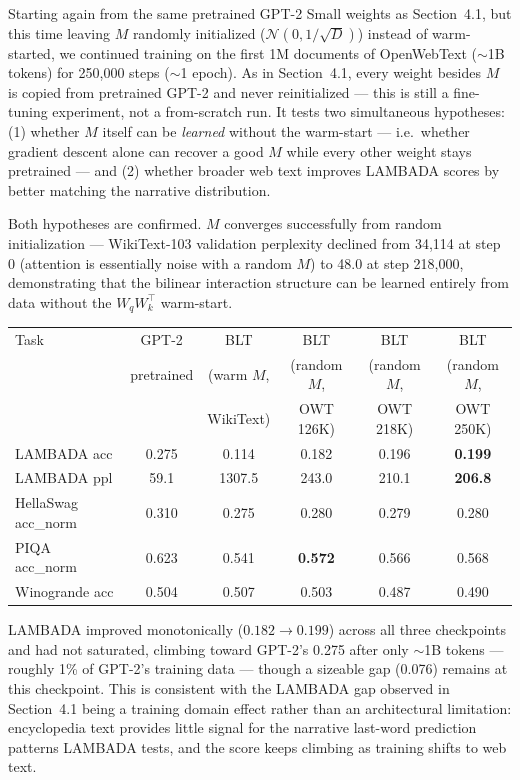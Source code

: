 \documentclass[11pt]{article}
\begin{document}
Starting again from the same pretrained GPT-2 Small weights as Section~4.1, but this time leaving $M$ randomly initialized ($\mathcal{N}(0, 1/\sqrt{D})$) instead of warm-started, we continued training on the first 1M documents of OpenWebText ($\sim$1B tokens) for 250{,}000 steps ($\sim$1 epoch). As in Section~4.1, every weight besides $M$ is copied from pretrained GPT-2 and never reinitialized --- this is still a fine-tuning experiment, not a from-scratch run. It tests two simultaneous hypotheses: (1) whether $M$ itself can be \emph{learned} without the warm-start --- i.e.\ whether gradient descent alone can recover a good $M$ while every other weight stays pretrained --- and (2) whether broader web text improves LAMBADA scores by better matching the narrative distribution.

Both hypotheses are confirmed. $M$ converges successfully from random initialization --- WikiText-103 validation perplexity declined from 34{,}114 at step 0 (attention is essentially noise with a random $M$) to 48.0 at step 218{,}000, demonstrating that the bilinear interaction structure can be learned entirely from data without the $W_q W_k^\top$ warm-start.

\begin{center}
\begin{tabular}{lccccc}
\toprule
Task & GPT-2 & BLT & BLT & BLT & BLT \\
 & pretrained & (warm $M$, & (random $M$, & (random $M$, & (random $M$, \\
 & & WikiText) & OWT 126K) & OWT 218K) & OWT 250K) \\
\midrule
LAMBADA acc & 0.275 & 0.114 & 0.182 & 0.196 & \textbf{0.199} \\
LAMBADA ppl & 59.1 & 1307.5 & 243.0 & 210.1 & \textbf{206.8} \\
HellaSwag acc\_norm & 0.310 & 0.275 & 0.280 & 0.279 & 0.280 \\
PIQA acc\_norm & 0.623 & 0.541 & \textbf{0.572} & 0.566 & 0.568 \\
Winogrande acc & 0.504 & 0.507 & 0.503 & 0.487 & 0.490 \\
\bottomrule
\end{tabular}
\end{center}

LAMBADA improved monotonically ($0.182 \rightarrow 0.199$) across all three checkpoints and had not saturated, climbing toward GPT-2's 0.275 after only $\sim$1B tokens --- roughly 1\% of GPT-2's training data --- though a sizeable gap (0.076) remains at this checkpoint. This is consistent with the LAMBADA gap observed in Section~4.1 being a training domain effect rather than an architectural limitation: encyclopedia text provides little signal for the narrative last-word prediction patterns LAMBADA tests, and the score keeps climbing as training shifts to web text.
\end{document}
